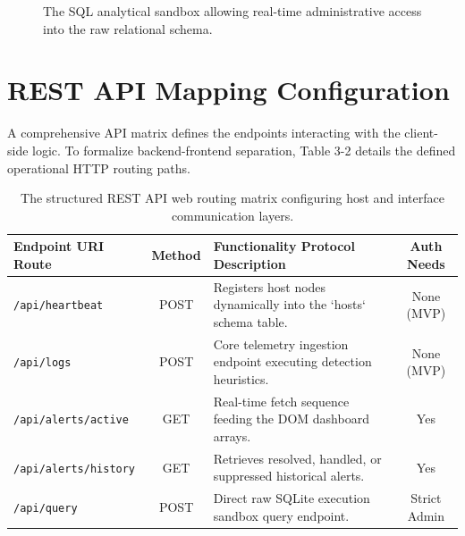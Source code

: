 \begin{figure}[h]
    \centering
    \caption{The SQL analytical sandbox allowing real-time administrative access into the raw relational schema.}
    \label{fig:sandbox_ui}
\end{figure}

\section{REST API Mapping Configuration}
A comprehensive API matrix defines the endpoints interacting with the client-side logic. To formalize backend-frontend separation, Table 3-2 details the defined operational HTTP routing paths.

\begin{table}[h]
\centering
\small
\begin{tabularx}{\textwidth}{|X|c|X|c|}
\hline
\textbf{Endpoint URI Route} & \textbf{Method} & \textbf{Functionality Protocol Description} & \textbf{Auth Needs} \\ \hline
\texttt{/api/heartbeat} & POST & Registers host nodes dynamically into the `hosts` schema table. & None (MVP) \\ \hline
\texttt{/api/logs} & POST & Core telemetry ingestion endpoint executing detection heuristics. & None (MVP) \\ \hline
\texttt{/api/alerts/active} & GET & Real-time fetch sequence feeding the DOM dashboard arrays. & Yes \\ \hline
\texttt{/api/alerts/history} & GET & Retrieves resolved, handled, or suppressed historical alerts. & Yes \\ \hline
\texttt{/api/query} & POST & Direct raw SQLite execution sandbox query endpoint. & Strict Admin \\ \hline
\end{tabularx}
\caption{The structured REST API web routing matrix configuring host and interface communication layers.}
\label{tab:api_maps}
\end{table}

